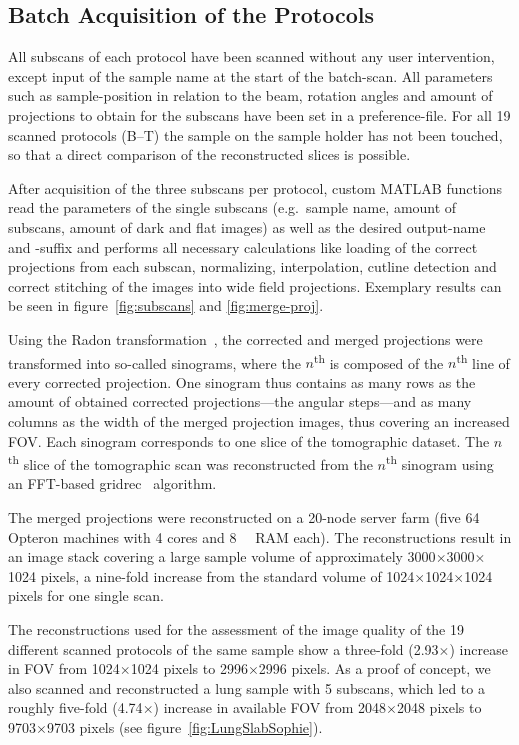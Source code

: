 \cbstart
\subsection{Batch Acquisition of the Protocols}
All subscans of each protocol have been scanned without any user intervention, except input of the sample name at the start of the batch-scan. All parameters such as sample-position in relation to the beam, rotation angles and amount of projections to obtain for the subscans have been set in a preference-file. For all 19 scanned protocols (B--T) the sample on the sample holder has not been touched, so that a direct comparison of the reconstructed slices is possible.

After acquisition of the three subscans per protocol, custom MATLAB functions read the parameters of the single subscans (e.g.\ sample name, amount of subscans, amount of dark and flat images) as well as the desired output-name and -suffix and performs all necessary calculations like loading of the correct projections from each subscan, normalizing, interpolation, cutline detection and correct stitching of the images into wide field projections. Exemplary results can be seen in figure~\ref{fig:subscans} and \ref{fig:merge-proj}.

Using the Radon transformation~\cite{Radon1917}, the corrected and merged projections were transformed into so-called sinograms, where the $n$\textsuperscript{th} is composed of the $n$\textsuperscript{th} line of every corrected projection. One sinogram thus contains as many rows as the amount of obtained corrected projections---the angular steps---and as many columns as the width of the merged projection images, thus covering an increased FOV. Each sinogram corresponds to one slice of the tomographic dataset. The $n$\textsuperscript{th} slice of the tomographic scan was reconstructed from the $n$\textsuperscript{th} sinogram using an FFT-based gridrec~\cite{Dowd1999} algorithm.

The merged projections were reconstructed on a 20-node server farm (five \SI{64}{\bit} Opteron machines with 4 cores and \SI{8}{\giga\byte} RAM each). The reconstructions result in an image stack covering a large sample volume of approximately 3000$\times$3000$\times$1024 pixels, a nine-fold increase from the standard volume of 1024$\times$1024$\times$1024 pixels for one single scan.
\cbend

The reconstructions used for the assessment of the image quality of the 19 different scanned protocols of the same sample show a three-fold (2.93\(\times\)) increase in FOV from 1024\(\times\)1024 pixels to 2996\(\times\)2996 pixels. As a proof of concept, we also scanned and reconstructed a lung sample with 5 subscans, which led to a roughly five-fold (4.74\(\times\)) increase in available FOV from 2048\(\times\)2048 pixels to 9703\(\times\)9703 pixels (see figure~\ref{fig:LungSlabSophie}).